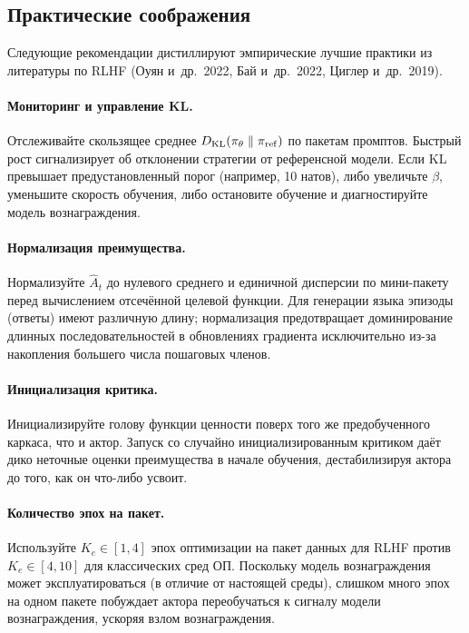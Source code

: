 \subsection{Практические соображения}

Следующие рекомендации дистиллируют эмпирические лучшие практики из литературы по RLHF (Оуян и~др.\ 2022, Бай и~др.\ 2022, Циглер и~др.\ 2019).

\paragraph{Мониторинг и управление KL.}
Отслеживайте скользящее среднее $D_{\mathrm{KL}}\!\left(\pi_\theta\;\|\;\pi_{\mathrm{ref}}\right)$ по пакетам промптов. Быстрый рост сигнализирует об отклонении стратегии от референсной модели. Если KL превышает предустановленный порог (например, 10 натов), либо увеличьте $\beta$, уменьшите скорость обучения, либо остановите обучение и диагностируйте модель вознаграждения.

\paragraph{Нормализация преимущества.}
Нормализуйте $\hat{A}_t$ до нулевого среднего и единичной дисперсии по мини-пакету перед вычислением отсечённой целевой функции. Для генерации языка эпизоды (ответы) имеют различную длину; нормализация предотвращает доминирование длинных последовательностей в обновлениях градиента исключительно из-за накопления большего числа пошаговых членов.

\paragraph{Инициализация критика.}
Инициализируйте голову функции ценности поверх того же предобученного каркаса, что и актор. Запуск со случайно инициализированным критиком даёт дико неточные оценки преимущества в начале обучения, дестабилизируя актора до того, как он что-либо усвоит.

\paragraph{Количество эпох на пакет.}
Используйте $K_e \in [1, 4]$ эпох оптимизации на пакет данных для RLHF против $K_e \in [4, 10]$ для классических сред ОП. Поскольку модель вознаграждения может эксплуатироваться (в отличие от настоящей среды), слишком много эпох на одном пакете побуждает актора переобучаться к сигналу модели вознаграждения, ускоряя взлом вознаграждения.

